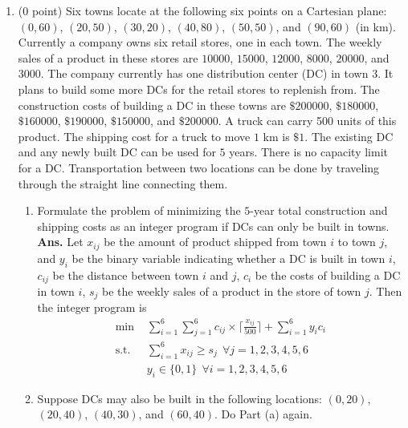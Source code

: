 \documentclass[12pt]{article}
\begin{document}
\begin{enumerate}
\begin{enumerate}
\begin{figure}[H]
                        \end{figure}
            \end{enumerate}
      \item (0 point) Six towns locate at the following six points on a Cartesian plane: $(0, 60)$, $(20, 50)$, $(30, 20)$, $(40,80)$, $(50,50)$, and $(90,60)$ (in km). Currently a company owns six retail stores, one in each town. The weekly sales of a product in these stores are $10000$, $15000$, $12000$, $8000$, $20000$, and $3000$. The company currently has one distribution center (DC) in town $3$. It plans to build some more DCs for the retail stores to replenish from. The construction costs of building a DC in these towns are $\$200000$, $\$180000$, $\$160000$, $\$190000$, $\$150000$, and $\$200000$. A truck can carry 500 units of this product. The shipping cost for a truck to move $1$ km is $\$1$. The existing DC and any newly built DC can be used for $5$ years. There is no capacity limit for a DC. Transportation between two locations can be done by traveling through the straight line connecting them.
            \begin{enumerate}
                  \item Formulate the problem of minimizing the $5$-year total construction and shipping costs as an integer program if DCs can only be built in towns.\\
                        \textbf{Ans. }
                        Let $x_{ij}$ be the amount of product shipped from town $i$ to town $j$, and $y_i$ be the binary variable indicating whether a DC is built in town $i$, $c_{ij}$ be the distance between town $i$ and $j$, $c_i$ be the costs of building a DC in town $i$, $s_j$ be the weekly sales of a product in the store of town $j$. Then the integer program is
                        \begin{align*}
                              \text{min }  & \sum_{i=1}^{6} \sum_{j=1}^{6} c_{ij}\times \lceil \frac{x_{ij}}{500}\rceil + \sum_{i=1}^{6} y_i c_i \\
                              \text{s.t. } & \sum_{i=1}^{6} x_{ij} \geq s_j \ \ \forall j = 1,2,3,4,5,6                                          \\
                                           & y_i \in \{0,1\} \ \ \forall i = 1,2,3,4,5,6
                        \end{align*}
                  \item Suppose DCs may also be built in the following locations: $(0, 20)$, $(20, 40)$, $(40, 30)$, and $(60, 40)$. Do Part (a) again.

\end{enumerate}
\end{enumerate}
\end{document}

